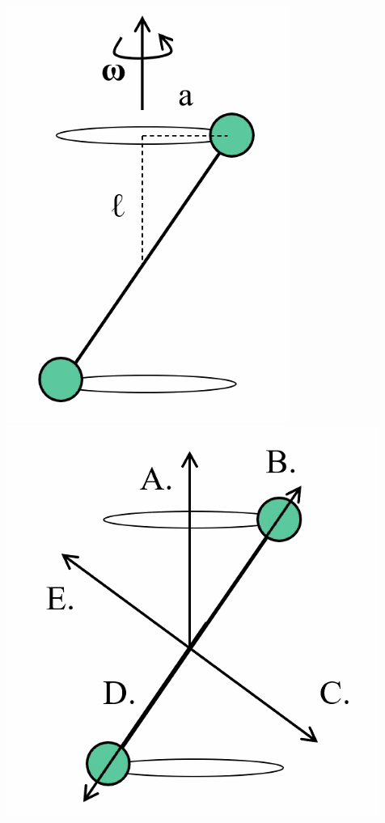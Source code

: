 \begin{center}
    \includegraphics[scale=0.5]{Lecture-18/l18-img1.png}
    \includegraphics[scale=0.5]{Lecture-18/l18-img2.png}
\end{center}
